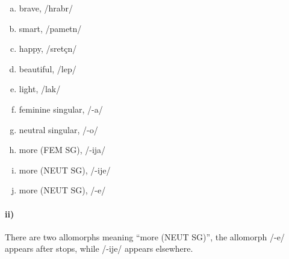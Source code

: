 \documentclass[12pt]{article}
\begin{document}
\begin{multicols}{2}
    \begin{enumerate}[a)]
        \item brave, /hrabr/
        \item smart, /pametn/
        \item happy, /sret\c cn/
        \item beautiful, /lep/
        \item light, /lak/
        \item feminine singular, /-a/
        \item neutral singular, /-o/
        \item more (FEM SG), /-ija/
        \item more (NEUT SG), /-ije/
        \item more (NEUT SG), /-\textesh e/
    \end{enumerate}
\end{multicols}

\paragraph{ii)}

There are two allomorphs meaning ``more (NEUT SG)'', the allomorph /-\textesh e/ appears after stops, while
/-ije/ appears elsewhere.
\end{document}
